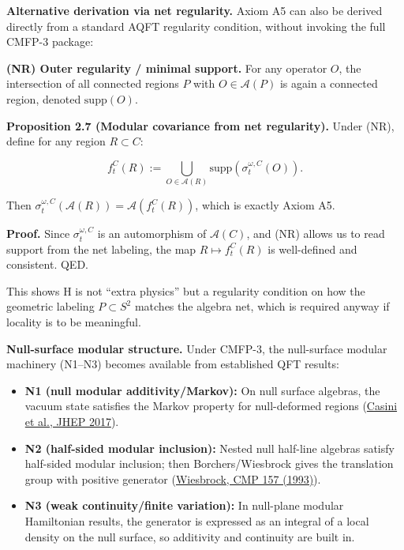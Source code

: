 \documentclass[
]{article}
\begin{document}
\textbf{Alternative derivation via net regularity.} Axiom A5 can also be
derived directly from a standard AQFT regularity condition, without
invoking the full CMFP-3 package:

\textbf{(NR) Outer regularity / minimal support.} For any operator
\(O\), the intersection of all connected regions \(P\) with
\(O \in \mathcal{A}(P)\) is again a connected region, denoted
\(\mathrm{supp}(O)\).

\textbf{Proposition 2.7 (Modular covariance from net regularity).} Under
(NR), define for any region \(R \subset C\):

\[
f_t^C(R) := \bigcup_{O \in \mathcal{A}(R)} \mathrm{supp}\left(\sigma_t^{\omega,C}(O)\right).
\]

Then \(\sigma_t^{\omega,C}(\mathcal{A}(R)) = \mathcal{A}(f_t^C(R))\),
which is exactly Axiom A5.

\textbf{Proof.} Since \(\sigma_t^{\omega,C}\) is an automorphism of
\(\mathcal{A}(C)\), and (NR) allows us to read support from the net
labeling, the map \(R \mapsto f_t^C(R)\) is well-defined and consistent.
QED.

This shows H is not ``extra physics'' but a regularity condition on how
the geometric labeling \(P \subset S^2\) matches the algebra net, which
is required anyway if locality is to be meaningful.

\textbf{Null-surface modular structure.} Under CMFP-3, the null-surface
modular machinery (N1--N3) becomes available from established QFT
results:

\begin{itemize}
\item
  \textbf{N1 (null modular additivity/Markov):} On null surface
  algebras, the vacuum state satisfies the Markov property for
  null-deformed regions (\href{https://arxiv.org/abs/1703.10656}{Casini
  et al., JHEP 2017}).
\item
  \textbf{N2 (half-sided modular inclusion):} Nested null half-line
  algebras satisfy half-sided modular inclusion; then Borchers/Wiesbrock
  gives the translation group with positive generator
  (\href{https://projecteuclid.org/journals/communications-in-mathematical-physics/volume-157/issue-1/Half-sided-modular-inclusions-of-von-Neumann-algebras/cmp/1104253848.pdf}{Wiesbrock,
  CMP 157 (1993)}).
\item
  \textbf{N3 (weak continuity/finite variation):} In null-plane modular
  Hamiltonian results, the generator is expressed as an integral of a
  local density on the null surface, so additivity and continuity are
  built in.
\end{itemize}
\end{document}
